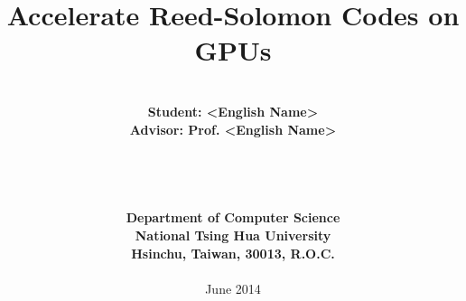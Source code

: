 \documentclass[a4paper,12pt,oneside,titlepage]{book}
\begin{document}


\title{\bf \Huge Accelerate Reed-Solomon Codes on GPUs}
\date{}
\author{
\begin{tabular}{c}
\\
\\
{\LARGE \bf Student: <English Name>}\\
{\LARGE \bf Advisor: Prof. <English Name>}\\
\\
\\
\\
\\
{\LARGE \bf Department of Computer Science}\\
{\LARGE \bf National Tsing Hua University}\\
{\LARGE \bf Hsinchu, Taiwan, 30013, R.O.C.}\\
\\
{\large June 2014}
\end{tabular}
}

\maketitle

\frontmatter
{}



\tableofcontents
\listoffigures

\mainmatter
{}







\backmatter

{


}



\end{document}
